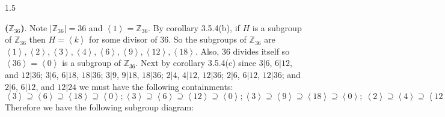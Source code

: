 \documentclass[12 pt]{article}
\newcommand{\Z}{{\mathbb Z}}
\begin{document}
\begin{spacing}{1.5}
\begin{flushleft}
\textbf{($\Z_{36}$)}. Note $|\Z_{36}|=36$ and $\left< 1 \right>=\Z_{36}$. By corollary 3.5.4(b), if $H$ is a subgroup of $\Z_{36}$ then  $H=\left< k \right>$ for some divisor of $36$. So the subgroups of $\Z_{36}$ are $\left< 1 \right>, \left< 2 \right>, \left< 3 \right>, \left< 4 \right>, \left< 6 \right>, \left< 9 \right>, \left< 12 \right>, \left< 18 \right>$. Also, 36 divides itself so $ \left< 36 \right>=\left< 0 \right>$ is a subgroup of $\Z_{36}$. Next by corollary 3.5.4(c) since $3|6$, $6|12$, and $12 | 36$; $3|6$, $6|18$, $18|36$; $3|9$, $9|18$, $18|36$; $2|4$, $4 | 12$, $12 | 36$; $2|6$, $6| 12$, $12 | 36$; and $2 |6$, $6|12$, and $12 | 24$ we must have the following containments: $
\left< 3 \right> \supseteq \left< 6 \right> \supseteq \left< 18 \right>\supseteq \left< 0 \right>; \left< 3 \right> \supseteq \left< 6 \right> \supseteq \left< 12 \right>\supseteq \left< 0 \right>; \left< 3 \right> \supseteq \left< 9 \right> \supseteq \left< 18 \right>\supseteq \left< 0 \right>; \   \left< 2 \right>\supseteq \left< 4 \right>\supseteq \left< 12 \right>\supseteq \left< 0\right>; \left< 2 \right>\supseteq \left< 6 \right>\supseteq \left< 12 \right>\supseteq \left< 0 \right>; \text{ and } \left< 2 \right>\supseteq \left< 6 \right>\supseteq \left< 18 \right>\supseteq \left< 0 \right>
$
Therefore we have the following subgroup diagram:
\\

\begin{figure}[H]
\centering
{}
\end{figure}


\end{flushleft}
\end{spacing}
\end{document}
